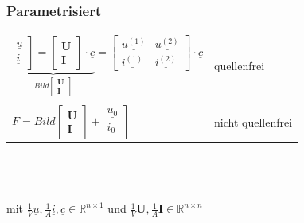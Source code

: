 \documentclass[a4paper,twocolumn,10pt]{article}
\begin{document}
\subsubsection*{Parametrisiert}
\begin{tabular}{ll}
$\underbrace{\left.\begin{matrix}\underline{u}\\\underline{i}\end{matrix}\right]=\begin{bmatrix}\textbf{U} \\ \textbf{I}\end{bmatrix}\cdot \underline{c}}_{Bild\begin{bmatrix}\textbf{U} \\ \textbf{I}\end{bmatrix}}=\begin{bmatrix}\underline{u^{(1)}} & \underline{u^{(2)}}\\ \underline{i^{(1)}} & \underline{i^{(2)}}\end{bmatrix}\cdot \underline{c}$ & quellenfrei\\\\
$F=Bild\begin{bmatrix}\textbf{U} \\ \textbf{I}\end{bmatrix}+\left.\begin{matrix}\underline{u_0}\\\underline{i_0}\end{matrix}\right]$ & nicht quellenfrei
\end{tabular}\\\\\\
mit $\frac{1}{V}\underline{u},\frac{1}{A}\underline{i},\underline{c}\in \mathbb{R}^{n\times 1}$ und $\frac{1}{V}\textbf{U},\frac{1}{A}\textbf{I}\in \mathbb{R}^{n\times n}$
\end{document}
